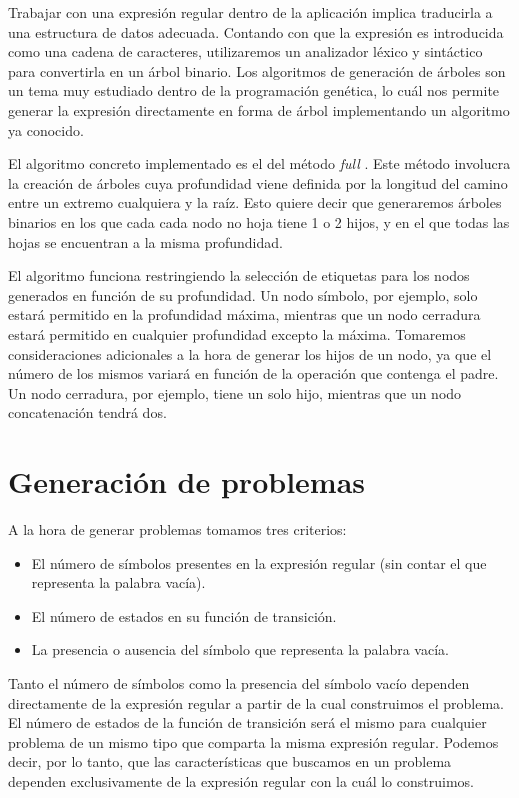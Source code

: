 
Trabajar con una expresión regular dentro de la aplicación implica traducirla a una estructura de datos adecuada.
Contando con que la expresión es introducida como una cadena de caracteres, utilizaremos un analizador léxico y sintáctico para convertirla en un árbol binario.
Los algoritmos de generación de árboles son un tema muy estudiado dentro de la programación genética, lo cuál nos permite generar la expresión directamente en forma de árbol implementando un algoritmo ya conocido.

El algoritmo concreto implementado es el del método \emph{full} \cite{koza92}.
Este método involucra la creación de árboles cuya profundidad viene definida por la longitud del camino entre un extremo cualquiera y la raíz.
Esto quiere decir que generaremos árboles binarios en los que cada cada nodo no hoja tiene 1 o 2 hijos, y en el que todas las hojas se encuentran a la misma profundidad.

El algoritmo funciona restringiendo la selección de etiquetas para los nodos generados en función de su profundidad.
Un nodo símbolo, por ejemplo, solo estará permitido en la profundidad máxima, mientras que un nodo cerradura estará permitido en cualquier profundidad excepto la máxima.
Tomaremos consideraciones adicionales a la hora de generar los hijos de un nodo, ya que el número de los mismos variará en función de la operación que contenga el padre.
Un nodo cerradura, por ejemplo, tiene un solo hijo, mientras que un nodo concatenación tendrá dos.

\section{Generación de problemas}

A la hora de generar problemas tomamos tres criterios:
\begin{itemize}
	\item El número de símbolos presentes en la expresión regular (sin contar el que representa la palabra vacía).
	\item El número de estados en su función de transición.
	\item La presencia o ausencia del símbolo que representa la palabra vacía.
\end{itemize}
Tanto el número de símbolos como la presencia del símbolo vacío dependen directamente de la expresión regular a partir de la cual construimos el problema.
El número de estados de la función de transición será el mismo para cualquier problema de un mismo tipo que comparta la misma expresión regular.
Podemos decir, por lo tanto, que las características que buscamos en un problema dependen exclusivamente de la expresión regular con la cuál lo construimos.

